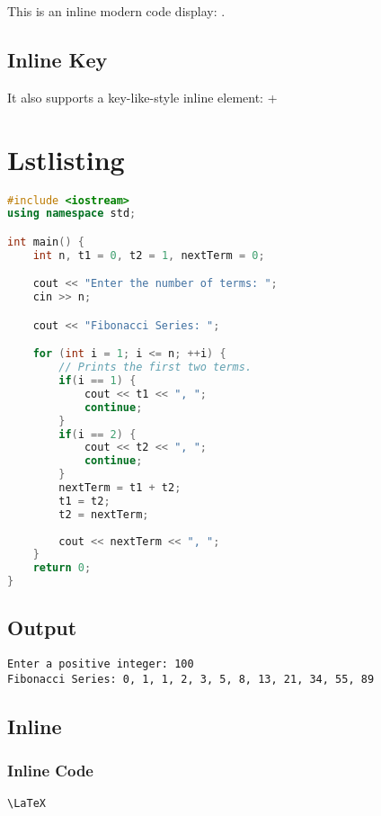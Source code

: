 \documentclass[10pt]{article}
\begin{document}
This is an inline modern code display: \moderncodeinline{\LaTeX}.

\subsection{Inline Key}

It also supports a key-like-style inline element:  + 

\section{Lstlisting}

\begin{lstlisting}[caption=Example in C++,language=c++]
#include <iostream>
using namespace std;

int main() {
    int n, t1 = 0, t2 = 1, nextTerm = 0;

    cout << "Enter the number of terms: ";
    cin >> n;

    cout << "Fibonacci Series: ";

    for (int i = 1; i <= n; ++i) {
        // Prints the first two terms.
        if(i == 1) {
            cout << t1 << ", ";
            continue;
        }
        if(i == 2) {
            cout << t2 << ", ";
            continue;
        }
        nextTerm = t1 + t2;
        t1 = t2;
        t2 = nextTerm;
        
        cout << nextTerm << ", ";
    }
    return 0;
}
\end{lstlisting}

\subsection{Output}

\begin{lstlisting}[style=lstoutput]
Enter a positive integer: 100
Fibonacci Series: 0, 1, 1, 2, 3, 5, 8, 13, 21, 34, 55, 89
\end{lstlisting}

\subsection{Inline}

\subsubsection{Inline Code}

\lstinline{\LaTeX}
\end{document}
